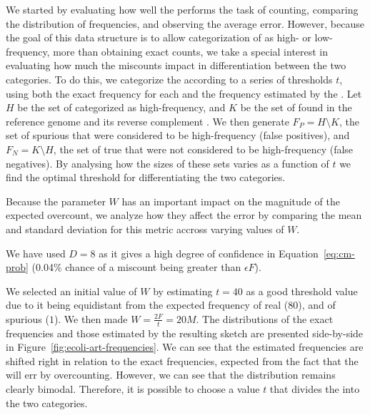 We started by evaluating how well the \dBCM performs the task of \kmer counting, comparing the distribution of frequencies, and observing the average error. However, because the goal of this data structure is to allow categorization of  as high- or low-frequency, more than obtaining exact \kmer counts, we take a special interest in evaluating how much the miscounts impact in differentiation between the two categories. To do this, we categorize the  according to a series of thresholds $t$, using both the exact frequency for each \kmer and the frequency estimated by the \dBCM. Let $H$ be the set of  categorized as high-frequency, and $K$ be the set of  found in the reference genome  and its reverse complement . We then generate $F_P = H \setminus K$, the set of spurious  that were considered to be high-frequency (false positives), and $F_N = K \setminus H$, the set of true  that were not considered to be high-frequency (false negatives). By analysing how the sizes of these sets varies as a function of $t$ we find the optimal threshold for differentiating the two categories.

Because the parameter $W$ has an important impact on the magnitude of the expected overcount, we analyze how they affect the error by comparing the mean and standard deviation for this metric accross varying values of $W$.

We have used $D = 8$ as it gives a high degree of confidence in Equation~\ref{eq:cm-prob} (0.04\% chance of a miscount being greater than $\epsilon F$).

We selected an initial value of $W$ by estimating $t = 40$ as a good threshold value due to it being equidistant from the expected frequency of real  ($80$), and of spurious  ($1$). We then made $W = \frac{2F}{t} = 20M$. The distributions of the exact frequencies and those estimated by the resulting \dBCM sketch are presented side-by-side in Figure~\ref{fig:ecoli-art-frequencies}. We can see that the estimated frequencies are shifted right in relation to the exact frequencies, expected from the fact that the \dBCM will err by overcounting. However, we can see that the distribution remains clearly bimodal. Therefore, it is possible to choose a value $t$ that divides the  into the two categories.

